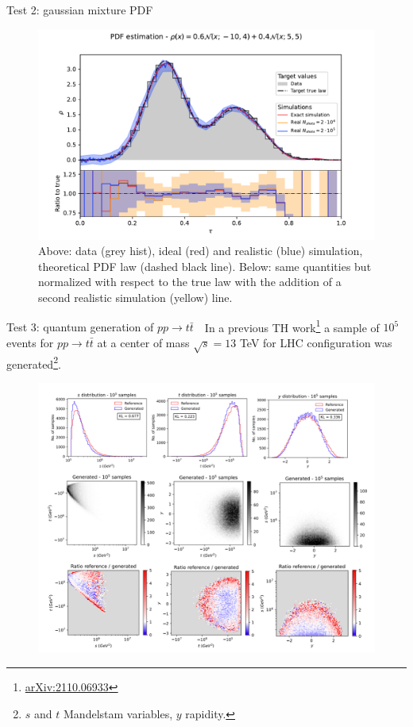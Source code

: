 \documentclass[8pt, xcolor={svgnames}, hyperref={colorlinks, linkcolor=black, citecolor=amethyst, urlcolor=amethyst}]{beamer}
\begin{document}
\begin{frame}[fragile]{Test 2: gaussian mixture PDF}
\begin{figure}
  \centering
  \includegraphics[width=1\linewidth]{figures/PDF_Gauss_30_20_200000.pdf}
    \caption{Above: data (grey hist), ideal (red) and realistic (blue) simulation,
  theoretical PDF law (dashed black line). Below: same quantities but normalized
  with respect to the true law with the addition of a second realistic simulation
  (yellow) line.}
\end{figure}
\end{frame}

\begin{frame}[fragile]{Test 3: quantum generation of $pp\to t\bar{t}$}
\faArrowCircleRight\,\, In a previous 
TH work\footnote{\href{https://arxiv.org/abs/2110.06933}{arXiv:2110.06933}} a 
sample of $10^{5}$ events for $pp\to t\bar{t}$ at a center of mass $\sqrt{s}=13$ 
TeV for LHC configuration was generated\footnote{$s$ and $t$ Mandelstam variables, $y$ rapidity.}.
\begin{figure}
  \centering
    \includegraphics[width=0.7\linewidth]{figures/qgan.png}%
\end{figure}
\end{frame}
\end{document}
